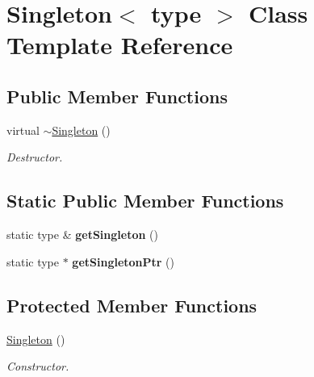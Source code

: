 \hypertarget{classSingleton}{
\section{Singleton$<$ type $>$ Class Template Reference}
\label{classSingleton}
}
\subsection*{Public Member Functions}
\begin{DoxyCompactItemize}
\item 
\hypertarget{classSingleton_ae4796cfb8f04fba7bb556e2a8c389162}{
virtual \hyperlink{classSingleton_ae4796cfb8f04fba7bb556e2a8c389162}{$\sim$Singleton} ()}
\label{classSingleton_ae4796cfb8f04fba7bb556e2a8c389162}

\begin{DoxyCompactList}\small\item\em Destructor. \item\end{DoxyCompactList}\end{DoxyCompactItemize}
\subsection*{Static Public Member Functions}
\begin{DoxyCompactItemize}
\item 
\hypertarget{classSingleton_a5c8fb723215374aecde038fe7ca205fc}{
static type \& {\bfseries getSingleton} ()}
\label{classSingleton_a5c8fb723215374aecde038fe7ca205fc}

\item 
\hypertarget{classSingleton_a86b173e3d50f8a902380f354f2213677}{
static type $\ast$ {\bfseries getSingletonPtr} ()}
\label{classSingleton_a86b173e3d50f8a902380f354f2213677}

\end{DoxyCompactItemize}
\subsection*{Protected Member Functions}
\begin{DoxyCompactItemize}
\item 
\hyperlink{classSingleton_ab357f8b89622a5207c7c3e58bf43bfb9}{Singleton} ()
\begin{DoxyCompactList}\small\item\em Constructor. \item\end{DoxyCompactList}\end{DoxyCompactItemize}
